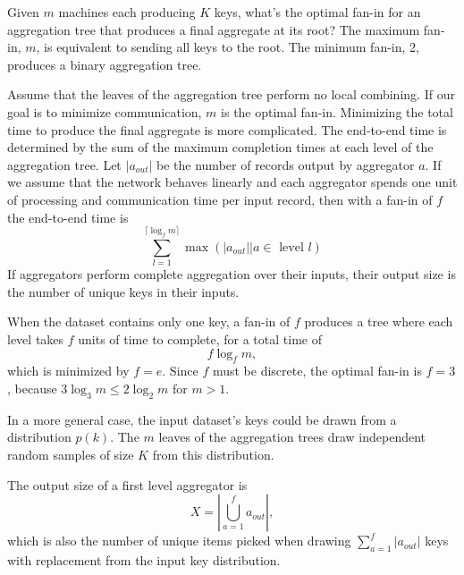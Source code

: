 \documentclass[12pt]{article}
\begin{document}
Given $m$ machines each producing $K$ keys, what's the optimal fan-in for an
aggregation tree that produces a final aggregate at its root?  The maximum
fan-in, $m$, is equivalent to sending all keys to the root.  The minimum
fan-in, 2, produces a binary aggregation tree.

Assume that the leaves of the aggregation tree perform no local combining.
If our goal is to minimize communication, $m$ is the optimal fan-in.
Minimizing the total time to produce the final aggregate is more complicated.
The end-to-end time is determined by the sum of the maximum completion times
at each level of the aggregation tree.  Let $|a_{out}|$ be the number of
records output by aggregator $a$.  If we assume that the network behaves
linearly and each aggregator spends one unit of processing and communication
time per input record, then with a fan-in of $f$ the end-to-end time is
\[
    \sum_{l=1}^{\lceil\log_fm\rceil}
        \max
        \left(
            |a_{out}| | a \in \text{ level } l
        \right)
\]
If aggregators perform complete aggregation over their inputs, their output
size is the number of unique keys in their inputs.

When the dataset contains only one key, a fan-in of $f$ produces a tree
where each level takes $f$ units of time to complete, for a total time of
\[
    f \log_f m,
\]
which is minimized by $f = e$.  Since $f$ must be discrete, the optimal fan-in
is $f = 3$, because $3 \log_3 m \leq 2 \log_2 m$ for $m > 1$.

In a more general case, the input dataset's keys could be drawn from
a distribution $p(k)$.  The $m$ leaves of the aggregation trees draw
independent random samples of size $K$ from this distribution.

The output size of a first level aggregator is
\[
   X =
   \left|
        \bigcup_{a=1}^f a_{out}
   \right|
   ,
\]
which is also the number of unique items picked when drawing $\sum_{a=1}^f
|a_{out}|$ keys with replacement from the input key distribution.


\end{document}
